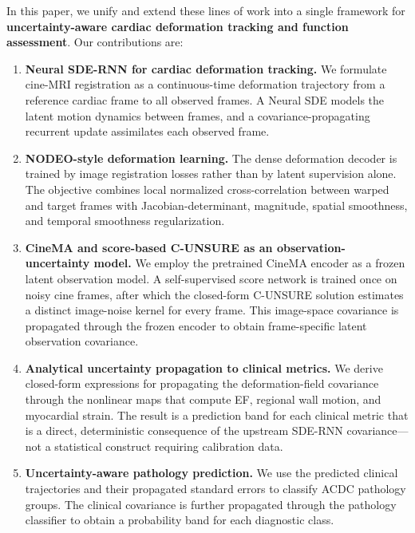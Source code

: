 \documentclass[10pt,twocolumn]{article}
\begin{document}
In this paper, we unify and extend these lines of work into a single framework for \textbf{uncertainty-aware cardiac deformation tracking and function assessment}. Our contributions are:

\begin{enumerate}
    \item \textbf{Neural SDE-RNN for cardiac deformation tracking.} We formulate cine-MRI registration as a continuous-time deformation trajectory from a reference cardiac frame to all observed frames. A Neural SDE models the latent motion dynamics between frames, and a covariance-propagating recurrent update assimilates each observed frame.

    \item \textbf{NODEO-style deformation learning.} The dense deformation decoder is trained by image registration losses rather than by latent supervision alone. The objective combines local normalized cross-correlation between warped and target frames with Jacobian-determinant, magnitude, spatial smoothness, and temporal smoothness regularization.

    \item \textbf{CineMA and score-based C-UNSURE as an observation-uncertainty model.} We employ the pretrained CineMA encoder as a frozen latent observation model. A self-supervised score network is trained once on noisy cine frames, after which the closed-form C-UNSURE solution estimates a distinct image-noise kernel for every frame. This image-space covariance is propagated through the frozen encoder to obtain frame-specific latent observation covariance.

    \item \textbf{Analytical uncertainty propagation to clinical metrics.} We derive closed-form expressions for propagating the deformation-field covariance through the nonlinear maps that compute EF, regional wall motion, and myocardial strain. The result is a prediction band for each clinical metric that is a direct, deterministic consequence of the upstream SDE-RNN covariance---not a statistical construct requiring calibration data.

    \item \textbf{Uncertainty-aware pathology prediction.} We use the predicted clinical trajectories and their propagated standard errors to classify ACDC pathology groups. The clinical covariance is further propagated through the pathology classifier to obtain a probability band for each diagnostic class.

\end{enumerate}
\end{document}

